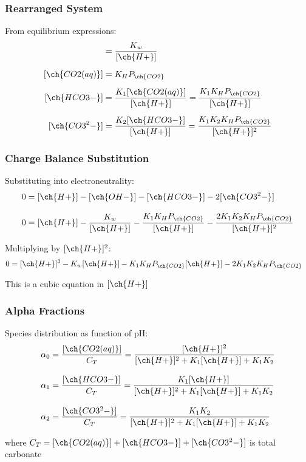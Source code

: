 \documentclass{beamer}
\begin{document}
\begin{frame}
\frametitle{Rearranged System}
From equilibrium expressions:
\begin{align}
[\ch{OH-}] &= \frac{K_w}{[\ch{H+}]} \\[0.2cm]
[\ch{CO2(aq)}] &= K_H P_{\ch{CO2}} \\[0.2cm]
[\ch{HCO3-}] &= \frac{K_1 [\ch{CO2(aq)}]}{[\ch{H+}]} = \frac{K_1 K_H P_{\ch{CO2}}}{[\ch{H+}]} \\[0.2cm]
[\ch{CO3^2-}] &= \frac{K_2 [\ch{HCO3-}]}{[\ch{H+}]} = \frac{K_1 K_2 K_H P_{\ch{CO2}}}{[\ch{H+}]^2}
\end{align}
\end{frame}

\begin{frame}
\frametitle{Charge Balance Substitution}
Substituting into electroneutrality:
\begin{align}
0 &= [\ch{H+}] - [\ch{OH-}] - [\ch{HCO3-}] - 2[\ch{CO3^2-}] \\[0.3cm]
0 &= [\ch{H+}] - \frac{K_w}{[\ch{H+}]} - \frac{K_1 K_H P_{\ch{CO2}}}{[\ch{H+}]} - \frac{2 K_1 K_2 K_H P_{\ch{CO2}}}{[\ch{H+}]^2}
\end{align}

Multiplying by $[\ch{H+}]^2$:
\begin{align}
0 &= [\ch{H+}]^3 - K_w [\ch{H+}] - K_1 K_H P_{\ch{CO2}} [\ch{H+}] - 2 K_1 K_2 K_H P_{\ch{CO2}}
\end{align}

This is a cubic equation in $[\ch{H+}]$
\end{frame}

\begin{frame}
\frametitle{Alpha Fractions}
Species distribution as function of pH:
\begin{align}
\alpha_0 &= \frac{[\ch{CO2(aq)}]}{C_T} = \frac{[\ch{H+}]^2}{[\ch{H+}]^2 + K_1[\ch{H+}] + K_1 K_2} \\[0.3cm]
\alpha_1 &= \frac{[\ch{HCO3-}]}{C_T} = \frac{K_1[\ch{H+}]}{[\ch{H+}]^2 + K_1[\ch{H+}] + K_1 K_2} \\[0.3cm]
\alpha_2 &= \frac{[\ch{CO3^2-}]}{C_T} = \frac{K_1 K_2}{[\ch{H+}]^2 + K_1[\ch{H+}] + K_1 K_2}
\end{align}

where $C_T = [\ch{CO2(aq)}] + [\ch{HCO3-}] + [\ch{CO3^2-}]$ is total carbonate
\end{frame}
\end{document}
